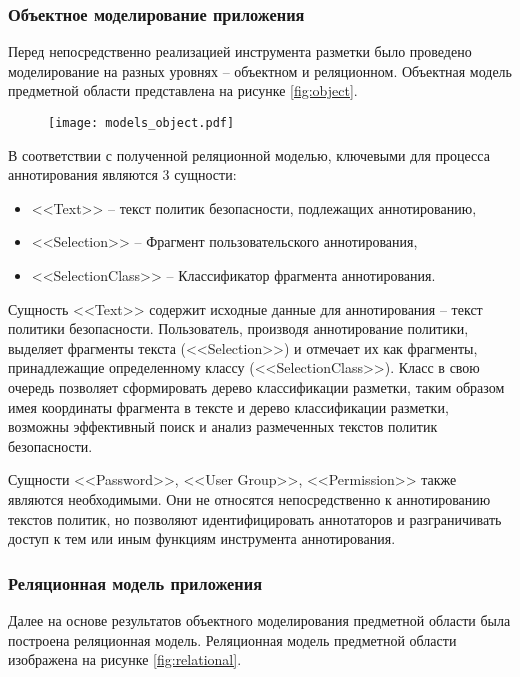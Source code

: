 \documentclass[../main]{subfiles}
\begin{document}
\subsubsection{Объектное моделирование приложения}

Перед непосредственно реализацией инструмента разметки было проведено моделирование на разных уровнях -- объектном и реляционном. Объектная модель предметной области представлена на рисунке \ref{fig:object}.

\begin{figure}[H]
    \centering
    {\texttt{[image: models\_object.pdf]}}
    \vspace{-\baselineskip}
\end{figure}

В соответствии с полученной реляционной моделью, ключевыми для процесса аннотирования являются 3 сущности:
\begin{itemize}
    \item <<Text>> -- текст политик безопасности, подлежащих аннотированию,
    \item <<Selection>> -- Фрагмент пользовательского аннотирования,
    \item <<SelectionClass>> -- Классификатор фрагмента аннотирования.
\end{itemize}

Сущность <<Text>> содержит исходные данные для аннотирования -- текст политики безопасности. Пользователь, производя аннотирование политики, выделяет фрагменты текста (<<Selection>>) и отмечает их как фрагменты, принадлежащие определенному классу (<<SelectionClass>>). Класс в свою очередь позволяет сформировать дерево классификации разметки, таким образом имея координаты фрагмента в тексте и дерево классификации разметки, возможны эффективный поиск и анализ размеченных текстов политик безопасности.

Сущности <<Password>>, <<User Group>>, <<Permission>> также являются необходимыми. Они не относятся непосредственно к аннотированию текстов политик, но позволяют идентифицировать аннотаторов и разграничивать доступ к тем или иным функциям инструмента аннотирования.

\subsubsection{Реляционная модель приложения}

Далее на основе результатов объектного моделирования предметной области была построена реляционная модель. Реляционная модель предметной области изображена на рисунке \ref{fig:relational}.
\end{document}
